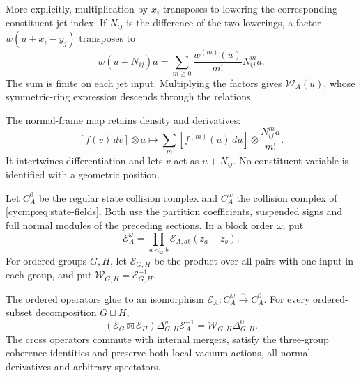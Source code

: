 More explicitly, multiplication by $x_i$ transposes to lowering the
corresponding constituent jet index. If $N_{ij}$ is the difference
of the two lowerings, a factor $w(u+x_i-y_j)$ transposes to
\[
 w(u+N_{ij})a=\sum_{m\ge0}\frac{w^{(m)}(u)}{m!}N_{ij}^ma.
\]
The sum is finite on each jet input. Multiplying the factors gives
$\mathcal W_A(u)$, whose symmetric-ring expression descends through
the relations.

The normal-frame map retains density and derivatives:
\[
 [f(v)\,dv]\otimes a\longmapsto
 \sum_m[f^{(m)}(u)\,du]\otimes\frac{N_{ij}^ma}{m!}.
\]
It intertwines differentiation and lets $v$ act as $u+N_{ij}$.
No constituent variable is identified with a geometric position.

Let $C_A^0$ be the regular state collision complex and $C_A^w$ the
collision complex of \eqref{cycmp:eq:state-fields}. Both use the
partition coefficients, suspended signs and full normal modules
of the preceding sections. In a block order $\omega$, put
\[
 \mathcal E_A^\omega=
       \prod_{a<_\omega b}\mathcal E_{A,ab}(z_a-z_b).
\]
For ordered groups $G,H$, let $\mathcal E_{G,H}$ be the product
over all pairs with one input in each group, and put
$\mathcal W_{G,H}=\mathcal E_{G,H}^{-1}$.

\begin{lemma}\label{cycmp:lem:interacting-coefficients}
The ordered operators glue to an isomorphism
$\mathscr E_A:C_A^w\xrightarrow{\sim}C_A^0$.
For every ordered-subset decomposition $G\sqcup H$,
\begin{equation}\label{cycmp:eq:interacting-cut}
 (\mathscr E_G\boxtimes\mathscr E_H)\Delta^w_{G,H}
                \mathscr E_A^{-1}
             =\mathcal W_{G,H}\Delta^0_{G,H}.
\end{equation}
The cross operators commute with internal mergers, satisfy the
three-group coherence identities and preserve both local vacuum
actions, all normal derivatives and arbitrary spectators.
\end{lemma}

